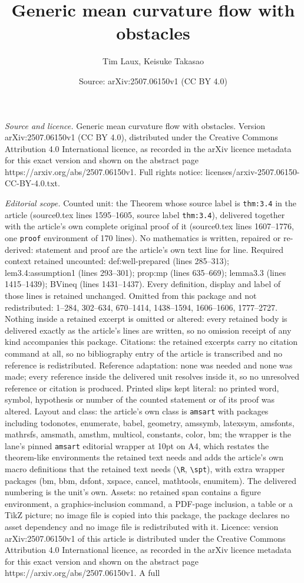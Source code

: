 \documentclass[10pt,a4paper]{amsart}
\title[Generic mean curvature flow with obstacles]{Generic mean curvature flow with obstacles}
\author{Tim Laux, Keisuke Takasao}
\date{Source: arXiv:2507.06150v1 (CC BY 4.0)}
\begin{document}
\maketitle

\noindent\emph{Source and licence.} Generic mean curvature flow with obstacles. Version arXiv:2507.06150v1 (CC BY 4.0), distributed under the Creative Commons Attribution 4.0 International licence, as recorded in the arXiv licence metadata for this exact version and shown on the abstract page https://arxiv.org/abs/2507.06150v1. Full rights notice: licenses/arxiv-2507.06150-CC-BY-4.0.txt.\par\smallskip

\noindent\textit{Editorial scope.} Counted unit: the Theorem whose source label is \texttt{thm:3.4} in the article (source0.tex lines 1595--1605, source label \texttt{thm:3.4}), delivered together with the article's own complete original proof of it (source0.tex lines 1607--1776, one \texttt{proof} environment of 170 lines). No mathematics is written, repaired or re-derived: statement and proof are the article's own text line for line. Required context retained uncounted: def:well-prepared (lines 285--313); lem3.4:assumption1 (lines 293--301); prop:mp (lines 635--669); lemma3.3 (lines 1415--1439); BVineq (lines 1431--1437). Every definition, display and label of those lines is retained unchanged. Omitted from this package and not redistributed: 1--284, 302--634, 670--1414, 1438--1594, 1606--1606, 1777--2727. Nothing inside a retained excerpt is omitted or altered: every retained body is delivered exactly as the article's lines are written, so no omission receipt of any kind accompanies this package. Citations: the retained excerpts carry no citation command at all, so no bibliography entry of the article is transcribed and no reference is redistributed. Reference adaptation: none was needed and none was made; every reference inside the delivered unit resolves inside it, so no unresolved reference or citation is produced. Printed slips kept literal: no printed word, symbol, hypothesis or number of the counted statement or of its proof was altered. Layout and class: the article's own class is \texttt{amsart} with packages including todonotes, enumerate, babel, geometry, amssymb, latexsym, amsfonts, mathrsfs, amsmath, amsthm, multicol, constants, color, bm; the wrapper is the lane's pinned \texttt{amsart} editorial wrapper at 10pt on A4, which restates the theorem-like environments the retained text needs and adds the article's own macro definitions that the retained text needs (\texttt{\textbackslash R}, \texttt{\textbackslash spt}), with extra wrapper packages (bm, bbm, dsfont, xspace, cancel, mathtools, enumitem). The delivered numbering is the unit's own. Assets: no retained span contains a figure environment, a graphics-inclusion command, a PDF-page inclusion, a table or a TikZ picture; no image file is copied into this package, the package declares no asset dependency and no image file is redistributed with it. Licence: version arXiv:2507.06150v1 of this article is distributed under the Creative Commons Attribution 4.0 International licence, as recorded in the arXiv licence metadata for this exact version and shown on the abstract page https://arxiv.org/abs/2507.06150v1. A full 
\end{document}
